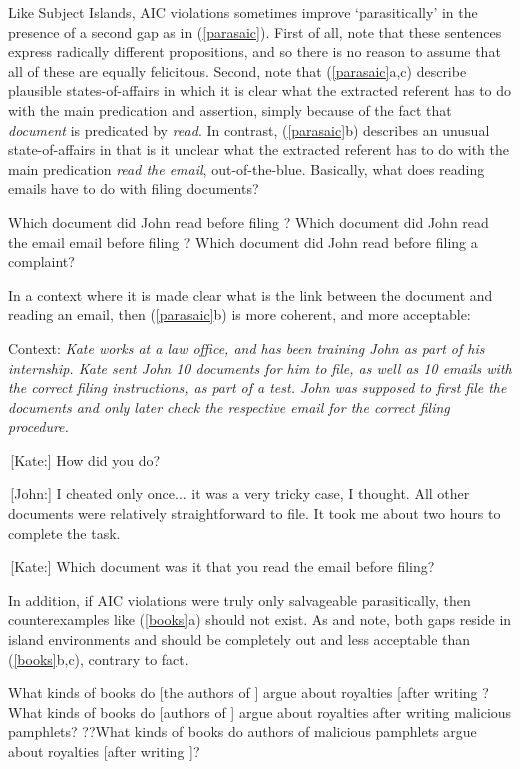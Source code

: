 \documentclass[output=paper]{langsci/langscibook}
\begin{document}
Like Subject Islands, AIC violations sometimes improve `parasitically' in the presence of a second gap as in (\ref{parasaic}). First of all, note that these sentences express radically different propositions, and so there is no reason to assume that all of these are equally felicitous.
Second, note that (\ref{parasaic}a,c) describe plausible  states-of-affairs in which it is clear what the extracted referent has to do with the main predication and assertion, simply because of the fact that \emph{document}  is predicated by \emph{read}.  In contrast, (\ref{parasaic}b) describes an unusual state-of-affairs in that is it unclear what the extracted referent  has to do with the main predication \emph{read the email}, out-of-the-blue. Basically, what does reading emails have to do with filing documents?

\ea 
\ea  Which document did John read \spcs before filing \spc? 
\ex \bad{*}Which document did John read the email email before filing \spc?
\ex Which document did John read \spcs before filing a complaint?
\z \label{parasaic}
\z

\noindent
In a context where it is made clear what is the link between the document and reading an email, then (\ref{parasaic}b) is more coherent,  and more acceptable:

\ea 
{\sc Context:} \emph{Kate works at a law office, and has been training John as part of his internship. Kate sent John 10 documents for him to file, as well as 10  emails with the correct filing instructions, as part of a test. John was supposed to first file the documents and only later check the respective email for the correct filing procedure.}

 \,[Kate:]  How did you do? 

 \,[John:]  I cheated only once... it was a very tricky case, I thought. All other
documents were relatively straightforward to file. It took me about two hours to complete the task.

 \,[Kate:]  Which document was it that you read the email before filing? 
\z

In addition, if AIC violations were truly only salvageable parasitically, then counterexamples
like (\ref{books}a) should not exist.  As 
\citet{Levine:Sag:03} and
\citet[256]{levhubook}
note, both gaps reside in island environments and should be 
completely out and less acceptable than (\ref{books}b,c), contrary to fact.

\ea
\ea What kinds of books do [the authors of \spc] argue about royalties [after writing \spc?
\ex \bad{*}What kinds of books do [authors of \spc] argue about royalties after writing malicious pamphlets?
\ex ??What kinds of books do authors of malicious pamphlets argue about royalties
[after writing \spc]?
\z \label{books}
\z
\end{document}
